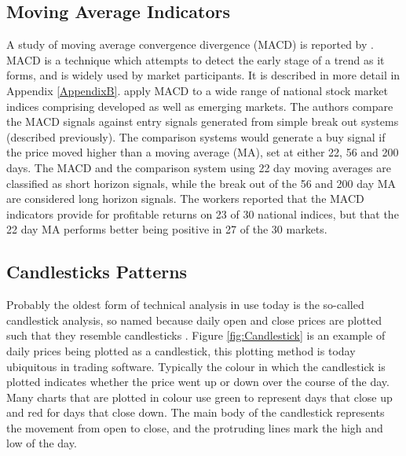 \subsection{Moving Average Indicators}
A study of moving average convergence divergence (MACD) is reported by \cite{Prodan2013214}. MACD is a technique which attempts to detect the early stage of a trend as it forms, and is widely used by market participants. It is described in more detail in Appendix \ref{AppendixB}. \cite{Prodan2013214} apply MACD to a wide range of national stock market indices comprising developed as well as emerging markets. The authors compare the MACD signals against entry signals generated from simple break out systems (described previously). The comparison systems would generate a buy signal if the price moved higher than a moving average (MA), set at either 22, 56 and 200 days. The MACD and the comparison system using 22 day moving averages are classified as short horizon signals, while the break out of the 56 and 200 day MA are considered long horizon signals. The workers reported that the MACD indicators provide for profitable returns on 23 of 30 national indices, but that the 22 day MA performs better being positive in 27 of the 30 markets.

%
%

\subsection{Candlesticks Patterns}
\label{sec:candlesticks}
Probably the oldest form of technical analysis in use today is the so-called candlestick analysis, so named because daily open and close prices are plotted such that they resemble candlesticks \citep{morris2006candlestick}. Figure \ref{fig:Candlestick} is an example of daily prices being plotted as a candlestick, this plotting method is today ubiquitous in trading software. Typically the colour in which the candlestick is plotted indicates whether the price went up or down over the course of the day. Many charts that are plotted in colour use green to represent days that close up and red for days that close down. The main body of the candlestick represents the movement from open to close, and the protruding lines mark the high and low of the day.

